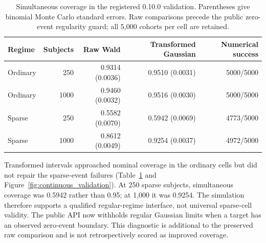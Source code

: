 \documentclass[article,nojss]{jss}
\begin{document}
\begin{table}[tbp]\centering\small
\begin{tabular}{lrrrr}\toprule
Regime & Subjects & Raw Wald & Transformed Gaussian & Numerical success \\ \midrule
Ordinary & 250 & 0.9314 (0.0036) & 0.9510 (0.0031) & 5000/5000 \\
Ordinary & 1000 & 0.9460 (0.0032) & 0.9516 (0.0030) & 5000/5000 \\
Sparse & 250 & 0.5582 (0.0070) & 0.5942 (0.0069) & 4773/5000 \\
Sparse & 1000 & 0.8612 (0.0049) & 0.9254 (0.0037) & 4972/5000 \\
\bottomrule\end{tabular}
\caption{Simultaneous coverage in the registered 0.10.0 validation. Parentheses give binomial Monte Carlo standard errors. Raw comparisons precede the public zero-event regularity guard; all 5,000 cohorts per cell are retained.}\label{tab:continuous_validation}
\end{table}

Transformed intervals approached nominal coverage in the ordinary cells but did not repair the sparse-event failures (Table~\ref{tab:continuous_validation} and Figure~\ref{fig:continuous_validation}). At 250 sparse subjects, simultaneous coverage was 0.5942 rather than 0.95; at 1,000 it was 0.9254. The simulation therefore supports a qualified regular-regime interface, not universal sparse-cell validity. The public API now withholds regular Gaussian limits when a target has an observed zero-event boundary. This diagnostic is additional to the preserved raw comparison and is not retrospectively scored as improved coverage.
\end{document}
